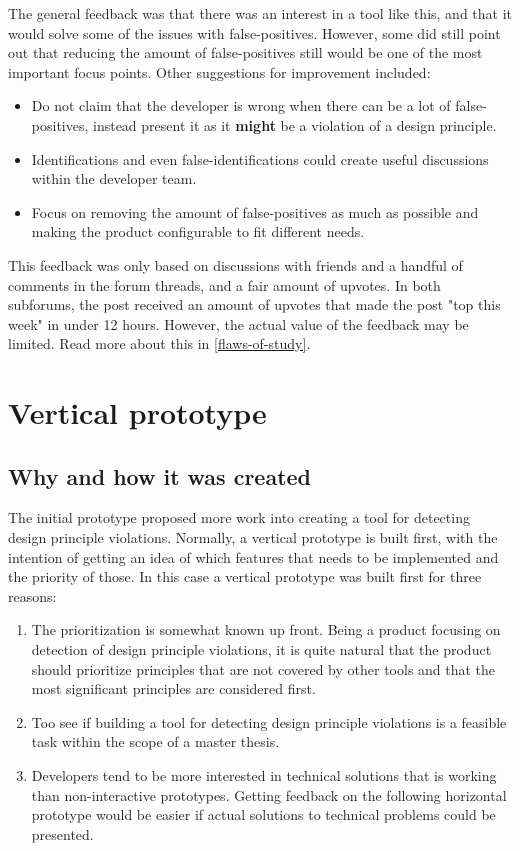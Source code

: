 \documentclass{report}
\begin{document}
The general feedback was that there was an interest in a tool like this, and that it would solve some of the issues with false-positives. However, some did still point out that reducing the amount of false-positives still would be one of the most important focus points. Other suggestions for improvement included: 
\begin{itemize}
    \item Do not claim that the developer is wrong when there can be a lot of false-positives, instead present it as it \textbf{might} be a violation of a design principle.
    \item Identifications and even false-identifications could create useful discussions within the developer team.
    \item Focus on removing the amount of false-positives as much as possible and making the product configurable to fit different needs.
\end{itemize}

This feedback was only based on discussions with friends and a handful of comments in the forum threads, and a fair amount of upvotes. In both subforums, the post received an amount of upvotes that made the post "top this week" in under 12 hours. However, the actual value of the feedback may be limited. Read more about this in \ref{flaws-of-study}. 

\section{Vertical prototype}

\subsection*{Why and how it was created}
The initial prototype proposed more work into creating a tool for detecting design principle violations. Normally, a vertical prototype is built first, with the intention of getting an idea of which features that needs to be implemented and the priority of those. In this case a vertical prototype was built first for three reasons:

\begin{enumerate}
    \item The prioritization is somewhat known up front. Being a product focusing on detection of design principle violations, it is quite natural that the product should prioritize principles that are not covered by other tools and that the most significant principles are considered first.
    \item Too see if building a tool for detecting design principle violations is a feasible task within the scope of a master thesis.
    \item Developers tend to be more interested in technical solutions that is working than non-interactive prototypes. Getting feedback on the following horizontal prototype would be easier if actual solutions to technical problems could be presented.
\end{enumerate}
\end{document}
